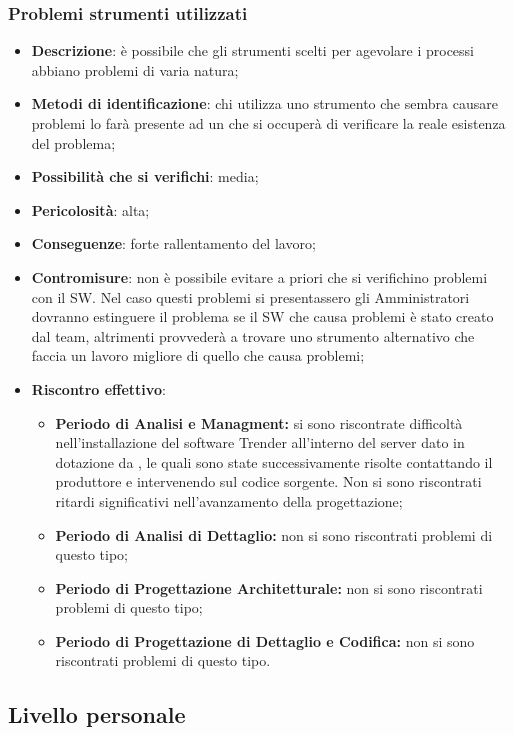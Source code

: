 		\subsubsection{Problemi  strumenti utilizzati}
		\begin{itemize}
			\item \textbf{Descrizione}: è possibile che gli strumenti scelti per agevolare i processi abbiano problemi di varia natura;
			\item \textbf{Metodi di identificazione}: chi utilizza uno strumento che sembra causare problemi lo farà presente ad un \AM{} che si occuperà di verificare la reale esistenza del problema;
			\item \textbf{Possibilità che si verifichi}: media;
			\item \textbf{Pericolosità}: alta;
			\item \textbf{Conseguenze}: forte rallentamento del lavoro;
			\item \textbf{Contromisure}: non è possibile evitare a priori che si verifichino problemi con il SW. Nel caso questi problemi si presentassero gli Amministratori dovranno estinguere il problema se il SW che causa problemi è stato creato dal team, altrimenti provvederà a trovare uno strumento alternativo che faccia un lavoro migliore di quello che causa problemi;
			\item \textbf{Riscontro effettivo}:
			\begin{itemize}
				\item \textbf{Periodo di Analisi e Managment:} si sono riscontrate difficoltà nell'installazione del software Trender all'interno del server dato in dotazione da \PROPONENTE, le quali sono state successivamente risolte contattando il produttore e intervenendo sul codice sorgente. Non si sono riscontrati ritardi significativi nell'avanzamento della progettazione;
				\item \textbf{Periodo di Analisi di Dettaglio:} non si sono riscontrati problemi di questo tipo;
				\item \textbf{Periodo di Progettazione Architetturale:} non si sono riscontrati problemi di questo tipo;
            \item \textbf{Periodo di Progettazione di Dettaglio e Codifica:} non si sono riscontrati problemi di questo tipo.
			\end{itemize}
		\end{itemize}


	\subsection{Livello personale}
	\label{sez2.2}
